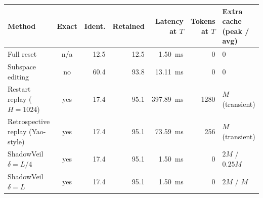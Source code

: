 \begin{tabular}{lcrrrrl}
\toprule
Method & Exact & Ident. & Retained & Latency at $T$ & Tokens at $T$ & Extra cache (peak / avg) \\
\midrule
Full reset & n/a & 12.5 & 12.5 & 1.50~ms & 0 & 0 \\
Subspace editing & no & 60.4 & 93.8 & 13.11~ms & 0 & 0 \\
Restart replay ($H{=}1024$) & yes & 17.4 & 95.1 & 397.89~ms & 1280 & $M$ (transient) \\
Retrospective replay (Yao-style) & yes & 17.4 & 95.1 & 73.59~ms & 256 & $M$ (transient) \\
ShadowVeil $\delta{=}L/4$ & yes & 17.4 & 95.1 & 1.50~ms & 0 & $2M$ / $0.25M$ \\
ShadowVeil $\delta{=}L$ & yes & 17.4 & 95.1 & 1.50~ms & 0 & $2M$ / $M$ \\
\bottomrule
\end{tabular}
